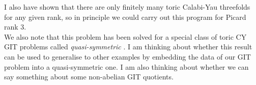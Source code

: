 \documentclass[oneside,reqno]{amsart}
\theoremstyle{definition}
\theoremstyle{definition}
\theoremstyle{definition}
\theoremstyle{definition}
\begin{document}
\newline
I also have shown that there are only finitely many toric Calabi-Yau threefolds for any given rank, so in principle we could carry out this program for Picard rank 3. \\
\newline
We also note that this problem has been solved for a special class of toric CY GIT problems called \textit{quasi-symmetric} \cite{quasi-sym}. I am thinking about whether this result can be used to generalise to other examples by embedding the data of our GIT problem into a quasi-symmetric one. I am also thinking about whether we can say something about some non-abelian GIT quotients. 


\end{document}
